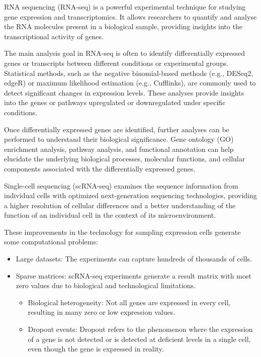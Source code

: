 \documentclass[aps,prb,twocolumn,superscriptaddress,floatfix,longbibliography]{revtex4-2}
\newif\ifptitle
\newif\ifpnumber
\newcounter{para}
\newcommand\ptitle[1]{\par\refstepcounter{para}
{\ifpnumber{\noindent\textcolor{lightgray}{\textbf{\thepara}}\indent}\fi}
{\ifptitle{\textbf{[{#1}]}}\fi}}
\begin{document}
\ptitle{RNA sequencing} RNA sequencing (RNA-seq) is a powerful experimental technique for studying gene expression and transcriptomics. It allows researchers to quantify and analyse the RNA molecules present in a biological sample, providing insights into the transcriptional activity of genes.

The main analysis goal in RNA-seq is often to identify differentially expressed genes or transcripts between different conditions or experimental groups. Statistical methods, such as the negative binomial-based methods (e.g., DESeq2, edgeR) or maximum likelihood estimation (e.g., Cufflinks), are commonly used to detect significant changes in expression levels. These analyses provide insights into the genes or pathways upregulated or downregulated under specific conditions.

Once differentially expressed genes are identified, further analyses can be performed to understand their biological significance. Gene ontology (GO) enrichment analysis, pathway analysis, and functional annotation can help elucidate the underlying biological processes, molecular functions, and cellular components associated with the differentially expressed genes.


\vspace{2mm}

\ptitle{Single-cell sequencing} \cite{triumphs-and-limitations-scRNA} Single-cell sequencing (scRNA-seq) examines the sequence information from individual cells with optimized next-generation sequencing technologies, providing a higher resolution of cellular differences and a better understanding of the function of an individual cell in the context of its microenvironment.

These improvements in the technology for sampling expression cells generate some computational problems:
\begin{itemize}
 \item Large datasets: The experiments can capture hundreds of thousands of cells.
 \item Sparse matrices: scRNA-seq experiments generate a result matrix with most zero values due to biological and technological limitations.
 \begin{itemize}
    \item Biological heterogeneity: Not all genes are expressed in every cell, resulting in many zero or low expression values.
    \item Dropout events: Dropout refers to the phenomenon where the expression of a gene is not detected or is detected at deficient levels in a single cell, even though the gene is expressed in reality.
 \end{itemize}

\end{itemize}
\end{document}
